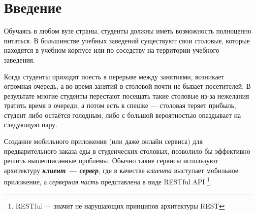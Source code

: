 \documentclass[14pt]{matmex-diploma-custom}
\begin{document}
\maketitle
\tableofcontents

\section*{Введение}
	Обучаясь в любом вузе страны, студенты должны иметь возможность полноценно питаться.
	В большинстве учебных заведений существуют свои столовые, которые находятся в учебном корпусе или по соседству на территории учебного заведения.

	Когда студенты приходят поесть в перерыве между занятиями, возникает огромная очередь, а во время занятий в столовой почти не бывает посетителей.
	В результате многие студенты перестают посещать такие столовые из-за нежелания тратить время в очереди, а потом есть в спешке — столовая теряет прибыль,
	студент либо остаётся голодным, либо с большой вероятностью опаздывает на следующую пару.

	Создание мобильного приложения (или даже онлайн сервиса) для предварительного заказа еды в студенческих столовых, позволило бы эффективно решить вышеописанные проблемы.
	Обычно такие сервисы используют архитектуру \textit{\textbf{клиент — сервер}}, где в качестве \textit{клиента} выступает мобильное приложение, а \textit{серверная часть} представлена в виде RESTful API \footnote{RESTful — значит не нарушающих принципов архитектуры REST}.
\end{document}
